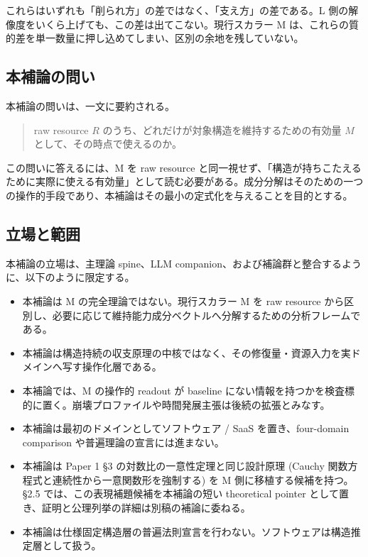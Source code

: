 \documentclass[12pt,a4paper]{article}
\begin{document}
これらはいずれも「削られ方」の差ではなく、「支え方」の差である。L 側の解像度をいくら上げても、この差は出てこない。現行スカラー M は、これらの質的差を単一数量に押し込めてしまい、区別の余地を残していない。

\subsection{本補論の問い}\label{ux672cux88dcux8ad6ux306eux554fux3044}

本補論の問いは、一文に要約される。

\begin{quote}
raw resource $R$ のうち、どれだけが対象構造を維持するための有効量 $M$ として、その時点で使えるのか。
\end{quote}

この問いに答えるには、M を raw resource と同一視せず、「構造が持ちこたえるために実際に使える有効量」として読む必要がある。成分分解はそのための一つの操作的手段であり、本補論はその最小の定式化を与えることを目的とする。

\subsection{立場と範囲}\label{ux7acbux5834ux3068ux7bc4ux56f2}

本補論の立場は、主理論 spine、LLM companion、および補論群と整合するように、以下のように限定する。

\begin{itemize}
\tightlist
\item
  本補論は M の完全理論ではない。現行スカラー M を raw resource から区別し、必要に応じて維持能力成分ベクトルへ分解するための分析フレームである。
\item
  本補論は構造持続の収支原理の中核ではなく、その修復量・資源入力を実ドメインへ写す操作化層である。
\item
  本補論では、M の操作的 readout が baseline にない情報を持つかを検査標的に置く。崩壊プロファイルや時間発展主張は後続の拡張とみなす。
\item
  本補論は最初のドメインとしてソフトウェア / SaaS を置き、four-domain comparison や普遍理論の宣言には進まない。
\item
  本補論は Paper 1 §3 の対数比の一意性定理と同じ設計原理 (Cauchy 関数方程式と連続性から一意関数形を強制する) を M 側に移植する候補を持つ。§2.5 では、この表現補題候補を本補論の短い theoretical pointer として置き、証明と公理列挙の詳細は別稿の補論に委ねる。
\item
  本補論は仕様固定構造層の普遍法則宣言を行わない。ソフトウェアは構造推定層として扱う。
\end{itemize}
\end{document}
